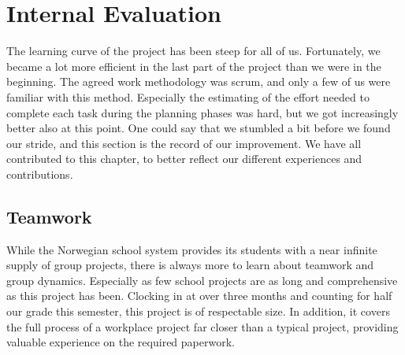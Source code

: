 \section{Internal Evaluation}\label{sec:refl_internal}
The learning curve of the project has been steep for all of us. Fortunately, we became a lot more efficient in the last part of the project than we were in the beginning. The agreed work methodology was scrum, and only a few of us were familiar with this method. Especially the estimating of the effort needed to complete each task during the planning phases was hard, but we got increasingly better also at this point. One could say that we stumbled a bit before we found our stride, and this section is the record of our improvement. We have all contributed to this chapter, to better reflect our different experiences and contributions.

\subsection{Teamwork}
While the Norwegian school system provides its students with a near infinite supply of group projects, there is always more to learn about teamwork and group dynamics. Especially as few school projects are as long and comprehensive as this project has been. Clocking in at over three months and counting for half our grade this semester, this project is of respectable size. In addition, it covers the full process of a workplace project far closer than a typical project, providing valuable experience on the required paperwork.

\newpage

